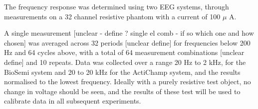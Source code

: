 The frequency response was determined using two EEG systems, through measurements on a 32 channel resistive phantom with a current of 100 $\mu$ A. 

A single measurement [unclear - define ? single el comb - if so which one and how chosen] was averaged across 32 periods [unclear define] for frequencies below 200 Hz and 64 cycles above, with a total of 64 measurement combinations [unclear define] and 10 repeats. Data was collected over a range 20 Hz to 2 kHz, for the BioSemi system and 20 to 20 kHz for the ActiChamp system, and the results normalised to the lowest frequency.  Ideally with a purely resistive test object, no change in voltage should be seen, and the results of these test will be used to calibrate data in all subsequent experiments.
